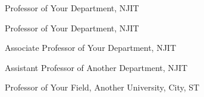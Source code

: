 %
%

        {Professor of Your Department, NJIT}


       {Professor of Your Department, NJIT}

       {Associate Professor of Your Department, NJIT}

       {Assistant Professor of Another Department, NJIT}

       {Professor of Your Field, Another University, City, ST}
